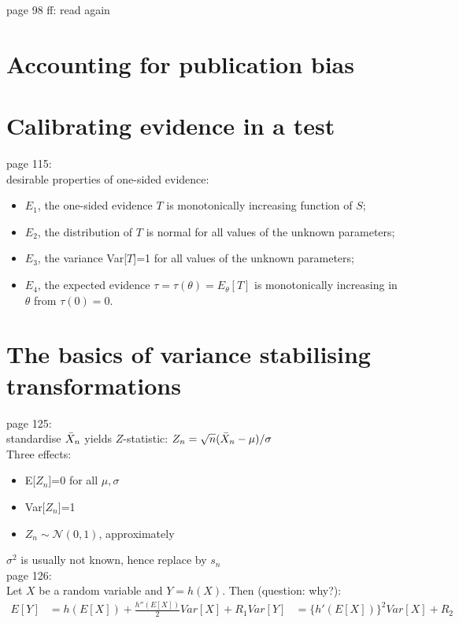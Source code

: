 page 98 ff: read again

\section{Accounting for publication bias}

\section{Calibrating evidence in a test}
page 115:\\

desirable properties of one-sided evidence:
\begin{itemize}
    \item $E_1$, the one-sided evidence $T$ is monotonically increasing function of $S$;
    \item $E_2$, the distribution of $T$ is normal for all values of the unknown parameters;
    \item $E_3$, the variance Var[$T$]=1 for all values of the unknown parameters;
    \item $E_4$, the expected evidence $\tau = \tau(\theta) = E_{\theta}[T]$ is monotonically increasing in $\theta$ from $\tau(0)=0$.
\end{itemize}

\section{The basics of variance stabilising transformations}
page 125:\\
standardise $\Bar{X}_n$ yields $Z$-statistic: $Z_n = \sqrt{n}(\Bar{X}_n-\mu)/\sigma$\\
Three effects:
\begin{itemize}
    \item E[$Z_n$]=0 for all $\mu,\sigma$
    \item Var[$Z_n$]=1
    \item $Z_n \sim \mathcal{N}(0,1)$, approximately
\end{itemize}
$\sigma^2$ is usually not known, hence replace by $s_n$\\

page 126:\\
Let $X$ be a random variable and $Y=h(X)$. Then (question: why?): 
\begin{align*}
    E[Y] &= h(E[X])+\frac{h''(E[X])}{2} Var[X] + R_1
    Var[Y] &= \{h'(E[X])\}^2 Var[X] + R_2
\end{align*}

